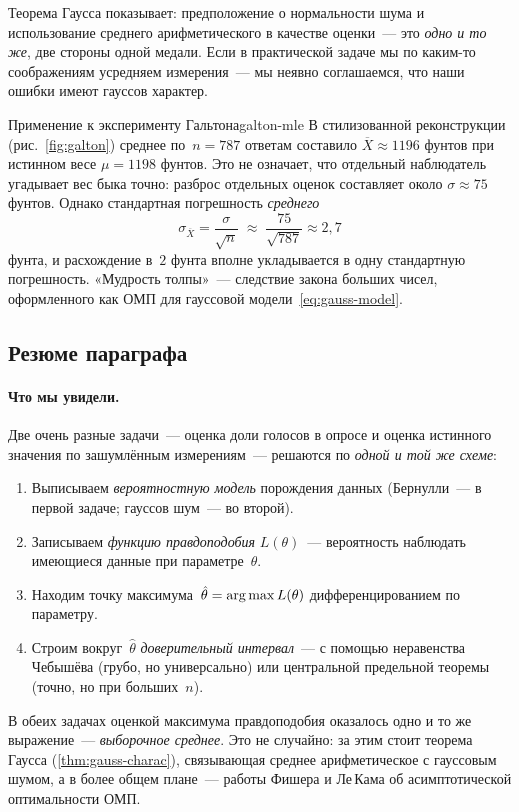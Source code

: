 \begin{notebox}
Теорема Гаусса показывает: предположение о нормальности шума и
использование среднего арифметического в качестве оценки~--- это
\emph{одно и то же}, две стороны одной медали. Если в практической
задаче мы по каким-то соображениям усредняем измерения~--- мы
неявно соглашаемся, что наши ошибки имеют гауссов характер.
\end{notebox}

\begin{example}{Применение к эксперименту Гальтона}{galton-mle}
В стилизованной реконструкции (рис.~\ref{fig:galton}) среднее по~$n=787$
ответам составило $\overline X\approx 1196$ фунтов при истинном весе
$\mu=1198$ фунтов. Это не означает, что отдельный наблюдатель угадывает
вес быка точно: разброс отдельных оценок составляет около $\sigma\approx 75$
фунтов. Однако стандартная погрешность \emph{среднего}
\[
\sigma_{\overline X}=\frac{\sigma}{\sqrt n}\;\approx\;\frac{75}{\sqrt{787}}\approx 2{,}7
\]
фунта, и расхождение в~$2$ фунта вполне укладывается в одну стандартную
погрешность. «Мудрость толпы»~--- следствие закона больших чисел,
оформленного как ОМП для гауссовой модели~\eqref{eq:gauss-model}.
\end{example}

\subsection{Резюме параграфа}

\paragraph{Что мы увидели.}
Две очень разные задачи~--- оценка доли голосов в опросе и оценка
истинного значения по зашумлённым измерениям~--- решаются по \emph{одной
и той же схеме}:
\begin{enumerate}\itemsep1pt
  \item Выписываем \emph{вероятностную модель} порождения данных
        (Бернулли~--- в первой задаче; гауссов шум~--- во второй).
  \item Записываем \emph{функцию правдоподобия} $L(\theta)$~--- вероятность
        наблюдать имеющиеся данные при параметре~$\theta$.
  \item Находим точку максимума~$\hat\theta=\operatorname*{arg\,max} L(\theta)$
        дифференцированием по параметру.
  \item Строим вокруг~$\hat\theta$ \emph{доверительный интервал}~---
        с помощью неравенства Чебышёва (грубо, но универсально) или
        центральной предельной теоремы (точно, но при больших~$n$).
\end{enumerate}
В обеих задачах оценкой максимума правдоподобия оказалось одно и то же
выражение~--- \emph{выборочное среднее}. Это не случайно: за этим стоит
теорема Гаусса (\cref{thm:gauss-charac}), связывающая среднее
арифметическое с гауссовым шумом, а в более общем плане~--- работы
Фишера и Ле\,Кама об асимптотической оптимальности ОМП.

